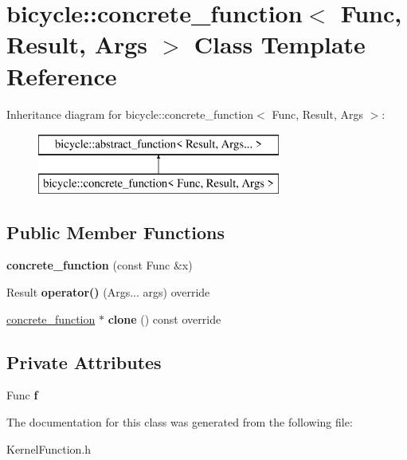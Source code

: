 \hypertarget{classbicycle_1_1concrete__function}{}\section{bicycle\+:\+:concrete\+\_\+function$<$ Func, Result, Args $>$ Class Template Reference}
\label{classbicycle_1_1concrete__function}
Inheritance diagram for bicycle\+:\+:concrete\+\_\+function$<$ Func, Result, Args $>$\+:\begin{figure}[H]
\begin{center}
\leavevmode
\includegraphics[height=2.000000cm]{classbicycle_1_1concrete__function}
\end{center}
\end{figure}
\subsection*{Public Member Functions}
\begin{DoxyCompactItemize}
\item 
\mbox{\label{classbicycle_1_1concrete__function_af923ccdf1171fa1fdb6d72c5658ef90e}} 
{\bfseries concrete\+\_\+function} (const Func \&x)
\item 
\mbox{\label{classbicycle_1_1concrete__function_ae06f11989f73271f6151e1095c2abb02}} 
Result {\bfseries operator()} (Args... args) override
\item 
\mbox{\label{classbicycle_1_1concrete__function_a784c42fdba4d6970e2f2a40cd064a26e}} 
\hyperlink{classbicycle_1_1concrete__function}{concrete\+\_\+function} $\ast$ {\bfseries clone} () const override
\end{DoxyCompactItemize}
\subsection*{Private Attributes}
\begin{DoxyCompactItemize}
\item 
\mbox{\label{classbicycle_1_1concrete__function_a9f0465bca48b1800f2fafafed2473c61}} 
Func {\bfseries f}
\end{DoxyCompactItemize}


The documentation for this class was generated from the following file\+:\begin{DoxyCompactItemize}
\item 
Kernel\+Function.\+h\end{DoxyCompactItemize}
